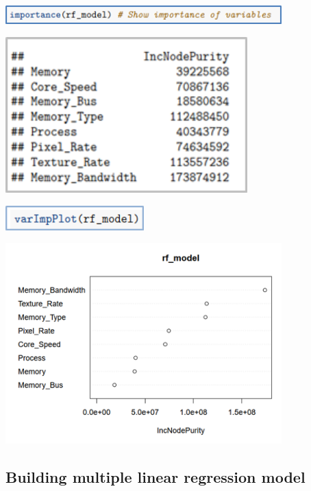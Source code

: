 \begin{center}
    \includegraphics[width=0.8\textwidth]{importance1.png}
\end{center}

\begin{center}
    \includegraphics[width=0.7\textwidth]{importance2.png}
\end{center}

\begin{center}
    \includegraphics[width=0.4\textwidth]{importance3.png}
\end{center}

\begin{center}
    \includegraphics[width=0.8\textwidth]{importance4.png}
\end{center}

\subsection{Building multiple linear regression model}


